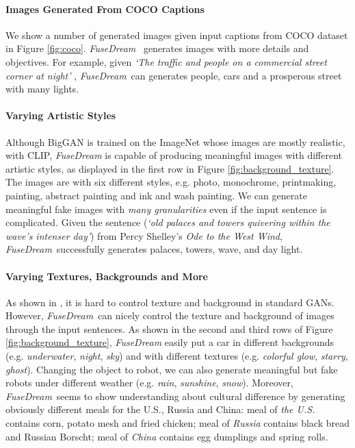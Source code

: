 \documentclass[10pt,twocolumn,letterpaper]{article}
\newcommand{\our}{\emph{FuseDream}}
\begin{document}
\paragraph{Images Generated From COCO Captions}
We show a number of generated images given input captions from COCO dataset in Figure \ref{fig:coco}.
\our~ generates images with more details and objectives. For example, given \emph{`The traffic and people on a commercial street corner at night'}
, \our~can generates people, cars and a prosperous street with many lights. 

\paragraph{Varying Artistic Styles}
Although BigGAN is trained on the ImageNet  whose images are mostly realistic,  
with CLIP, {\our} is capable of producing meaningful images with different artistic styles, as displayed in the first row in Figure \ref{fig:background_texture}.  
The images are with six different styles, e.g. photo, monochrome, printmaking, painting, abstract painting and ink and wash painting. We can generate meaningful fake images with \emph{many granularities} even if the input sentence is complicated. 
Given the sentence (\emph{`old palaces and towers quivering within the wave's intenser day'}) from Percy Shelley's \textit{Ode to the West Wind}, \our~successfully generates palaces, towers, wave, and day light.

\iffalse
In addition, images in different styles are visually distinguishable: \emph{Photo} contains more details; \emph{Monochrome} uses only one color; \emph{Printmaking}
contains more straight lines and less colors; 
\emph{Painting} has better representation of texture, mixture of colors with impasto and sense of space; 
\emph{Abstract} contains large-scale color blocks; 
\emph{Ink wash} painting uses strong brush strokes and characteristic coloring. 
Meanwhile, the stylized images still reflect the semantic meanings of the query text.
\fi

\paragraph{Varying Textures, Backgrounds and More}
As shown in \cite{harkonen2020ganspace,sauer2021counterfactual}, it is hard to control texture and background in standard GANs.
However, \our~can nicely control the texture and background of images through the input sentences. 
As shown in the second and third rows of Figure \ref{fig:background_texture}, 
{\our} easily put a car in different backgrounds (e.g. \emph{underwater}, \emph{night}, \emph{sky}) and with different textures (e.g. \emph{colorful glow}, \emph{starry}, \emph{ghost}).
Changing the object to robot, we can also generate meaningful but fake robots under different weather (e.g. \emph{rain}, \emph{sunshine}, \emph{snow}).
Moreover, \our~seems to show understanding about cultural difference by generating obviously different meals for the U.S., Russia and China: 
meal of \emph{the U.S.} contains corn, potato mesh and fried chicken; meal of \emph{Russia} contains black bread and Russian Borscht; meal of \emph{China} contains egg dumplings and spring rolls. 
\end{document}

